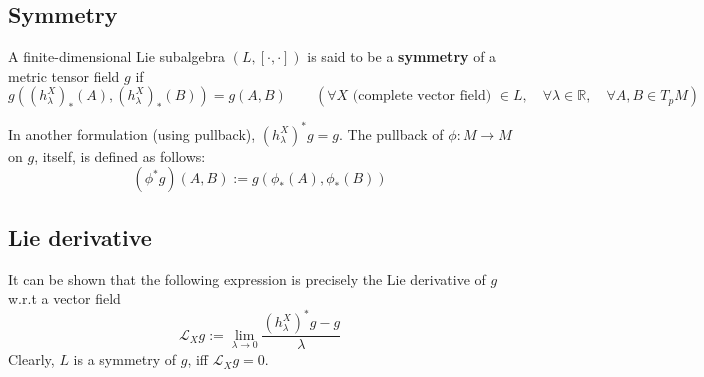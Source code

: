 \subsection{Symmetry}
\begin{definition}
A finite-dimensional Lie subalgebra $(L,[\cdot,\cdot])$ is said to be a \textbf{symmetry} of a metric tensor field $g$ if
\[
\boxed{g \left( \left(h^X_\lambda\right)_\ast (A), \left(h^X_\lambda\right)_\ast (B) \right) = g(A,B)} \quad\quad (\forall X \text{ (complete vector field) } \in L, \quad \forall \lambda \in \mathbb{R}, \quad \forall A, B \in T_pM)
\]
\end{definition}

In another formulation (using pullback), $\boxed{\left(h^X_\lambda\right)^\ast g = g}$. The pullback of $\phi : M \to M$ on $g$, itself, is defined as follows:
\[
(\phi^\ast g)(A, B) := g(\phi_\ast(A), \phi_\ast(B))
\]


\subsection{Lie derivative}
It can be shown that the following expression is precisely the Lie derivative of $g$ w.r.t a vector field
\begin{equation}
\boxed{\mathcal{L}_X g := \lim_{\lambda \to 0} \frac{\left( h_\lambda^X \right)^\ast g - g}{\lambda}}
\end{equation}
Clearly, $L$ is a symmetry of $g$, iff $\mathcal{L}_X g = 0$.

